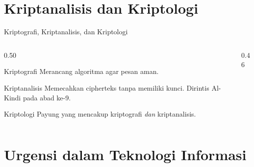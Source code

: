 \documentclass[aspectratio=169,11pt]{beamer}
\begin{document}
\section{Kriptanalisis dan Kriptologi}

\begin{frame}{Kriptografi, Kriptanalisis, dan Kriptologi}
    \begin{columns}[T,onlytextwidth]
        \begin{column}{0.50\textwidth}
            \begin{block}{Kriptografi}
                Merancang algoritma agar pesan aman.
            \end{block}
            \begin{alertblock}{Kriptanalisis}
                Memecahkan cipherteks tanpa memiliki kunci. Dirintis Al-Kindi
                pada abad ke-9.
            \end{alertblock}
            \begin{exampleblock}{Kriptologi}
                Payung yang mencakup kriptografi \emph{dan} kriptanalisis.
            \end{exampleblock}
        \end{column}
        \begin{column}{0.46\textwidth}
            \centering
        \end{column}
    \end{columns}
\end{frame}

\section{Urgensi dalam Teknologi Informasi}
\end{document}
